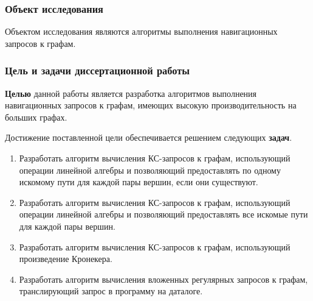 
\subsubsection*{\large{Объект исследования}}

 Объектом исследования являются алгоритмы выполнения навигационных запросов к графам.

\subsubsection*{\large{Цель и задачи диссертационной работы}}

\textbf{Целью} данной работы является разработка алгоритмов выполнения навигационных запросов к графам, имеющих высокую производительность на больших графах.

Достижение поставленной цели обеспечивается решением следующих \textbf{задач}.
\begin{enumerate}
	\item Разработать алгоритм вычисления КС-запросов к графам, использующий операции линейной алгебры и позволяющий предоставлять по одному искомому пути для каждой пары вершин, если они существуют.
	\item Разработать алгоритм вычисления КС-запросов к графам, использующий операции линейной алгебры и позволяющий предоставлять все искомые пути для каждой пары вершин.
	\item Разработать алгоритм вычисления КС-запросов к графам, использующий произведение Кронекера.
	\item Разработать алгоритм вычисления вложенных регулярных запросов к графам, транслирующий запрос в программу на даталоге.
\end{enumerate}


